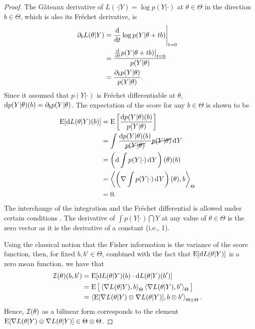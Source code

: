 \begin{proof}
  


The Gâteaux derivative of $L(\cdot|Y) = \log p(Y|\cdot)$ at $\theta\in\Theta$ in the direction $b\in\Theta$, which is also its Fréchet derivative, is
\begin{align*}
  \partial_b L(\theta|Y) 
  &= \frac{\text{d}}{\text{d} t} \log p(Y|\theta + tb) \Bigg|_{t=0} \\
  &= \frac{\frac{\text{d}}{\text{d} t}p(Y|\theta + tb)\big|_{t=0}}{p(Y|\theta)} \\
  &= \frac{\partial_b p(Y|\theta)}{p(Y|\theta)}.
\end{align*}
Since it assumed that $p(Y|\cdot)$ is Fréchet differentiable at $\theta$, $\text{d} p(Y|\theta)(b) = \partial_b p(Y|\theta)$.
The expectation of the score for any $b\in\Theta$ is shown to be
\begin{align*}
  \operatorname{E}[\text{d} L(\theta|Y)(b)] 
  &= \operatorname{E} \left[ \frac{\text{d} p(Y|\theta)(b)}{p(Y|\theta)} \right] \\
  &= \int \frac{\text{d} p(Y|\theta)(b)}{\cancel{p(Y|\theta)}} \cancel{p(Y|\theta)} \operatorname{d}\hspace{0.5pt}\! Y \\
  &= \left(\text{d}\int p(Y|\cdot) \operatorname{d}\hspace{0.5pt}\! Y \right)(\theta)(b) \\
  &= \left\langle \left(\nabla \int p(Y|\cdot) \operatorname{d}\hspace{0.5pt}\! Y\right)(\theta)  , b \right\rangle_\Theta \\
  &=0.
\end{align*}
The interchange of the integration and the Fréchet differential is allowed under certain conditions \citep{kammar2016}.
The derivative of $\int p(Y|\cdot)\dint Y$ at any value of $\theta\in\Theta$ is the zero vector as it is the derivative of a constant (i.e., 1).

Using the classical notion that the Fisher information is the variance of the score function, then, for fixed $b,b'\in\Theta$, combined with the fact that $\operatorname{E}[\text{d} L(\theta|Y)]$ is a zero mean function, we have that 
\begin{align*}
  {\mathcal I}(\theta)(b,b') 
  &= \operatorname{E} [ \text{d} L(\theta|Y)(b) \cdot \text{d} L(\theta|Y)(b') ] \\
  &= \operatorname{E} \big[ \left\langle \nabla L(\theta|Y) , b \right\rangle_\Theta \left\langle \nabla L(\theta|Y) , b' \right\rangle_\Theta \big] \\
  &= \left\langle \operatorname{E} [\nabla L(\theta|Y) \otimes \nabla L(\theta|Y)] , b \otimes b' \right\rangle_{\Theta\otimes\Theta}.
\end{align*}
Hence, ${\mathcal I}(\theta)$ as a bilinear form corresponds to the element $\operatorname{E} [\nabla L(\theta|Y) \otimes \nabla L(\theta|Y)] \in \Theta\otimes\Theta$.


\end{proof}
